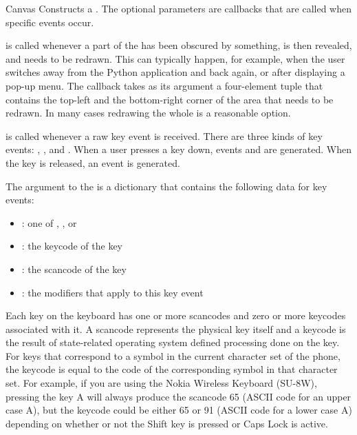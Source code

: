 \begin{classdesc}{Canvas}{}
Constructs a . The optional parameters are callbacks
that are called when specific events occur. 


 is called whenever a part of the  
has been obscured by something, is then revealed, and needs to be
redrawn. This can typically happen, for example, when the user
switches away from the Python application and back again, or after
displaying a pop-up menu. The callback takes as its argument a
four-element tuple that contains the top-left and the bottom-right
corner of the area that needs to be redrawn. In many cases redrawing
the whole
 is a reasonable option. 

 is called whenever a raw key event is received.
There are three kinds of key events: ,
, and . When a user presses a key 
down, events  and  are generated. 
When the key is released, an  event is generated.

The argument to the  is a dictionary that contains 
the following data for key events:

\begin{itemize}
\item {}: one of , , or 
\item {}: the keycode of the key
\item {}: the scancode of the key
\item {}: the modifiers that apply to this key event
\end{itemize}

Each key on the keyboard has one or more scancodes and zero or more keycodes 
associated with it. A scancode represents the physical key itself and a 
keycode is the result of state-related operating system defined processing 
done on the key. For keys that correspond to a symbol in the current 
character set of the phone, the keycode is equal to the code of the 
corresponding symbol in that character set. For example, if you are using 
the Nokia Wireless Keyboard (SU-8W), pressing the key A will always produce 
the scancode 65 (ASCII code for an upper case A), but the keycode 
could be either 65 or 91 (ASCII code for a lower case A) depending on 
whether or not the Shift key is pressed or Caps Lock is active. 


\end{classdesc}
